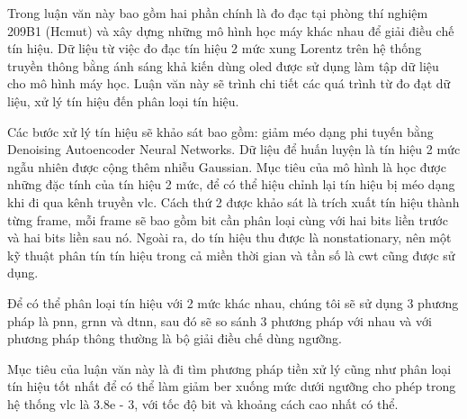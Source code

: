 Trong luận văn này bao gồm hai phần chính là đo đạc tại phòng thí nghiệm 209B1 (Hcmut) và xây dựng những mô hình học máy khác nhau để giải điều chế tín hiệu. Dữ liệu từ việc đo đạc tín hiệu 2 mức xung Lorentz trên hệ thống truyền thông bằng ánh sáng khả kiến dùng \ac{oled} được sử dụng làm tập dữ liệu cho mô hình máy học. Luận văn này sẽ trình chi tiết các quá trình từ đo đạt dữ liệu,  xử lý tín hiệu đến phân loại tín hiệu.

Các bước xử lý tín hiệu sẽ khảo sát bao gồm: giảm méo dạng phi tuyến bằng Denoising Autoencoder Neural Networks. Dữ liệu để huấn luyện là tín hiệu 2 mức ngẫu nhiên được cộng thêm nhiễu Gaussian. Mục tiêu của mô hình là học được những đặc tính của tín hiệu 2 mức, để có thể hiệu chỉnh lại tín hiệu bị méo dạng khi đi qua kênh truyền \ac{vlc}. Cách thứ 2 được khảo sát là trích xuất tín hiệu thành từng frame, mỗi frame sẽ bao gồm bit cần phân loại cùng với hai bits liền trước và hai bits liền sau nó. Ngoài ra, do tín hiệu thu được là nonstationary, nên một kỹ thuật phân tín tín hiệu trong cả miền thời gian và tần số là \ac{cwt} cũng được sử dụng.

Để có thể phân loại tín hiệu với 2 mức khác nhau, chúng tôi sẽ sử dụng 3 phương pháp là \ac{pnn}, \ac{grnn} và \ac{dtnn}, sau đó sẽ so sánh 3 phương pháp với nhau và với phương pháp thông thường là bộ giải điều chế dùng ngưỡng.

Mục tiêu của luận văn này là đi tìm phương pháp tiền xử lý cũng như phân loại tín hiệu tốt nhất để có thể làm giảm \ac{ber} xuống mức dưới ngưỡng cho phép trong hệ thống \ac{vlc} là 3.8e - 3, với tốc độ bit và khoảng cách cao nhất có thể. 